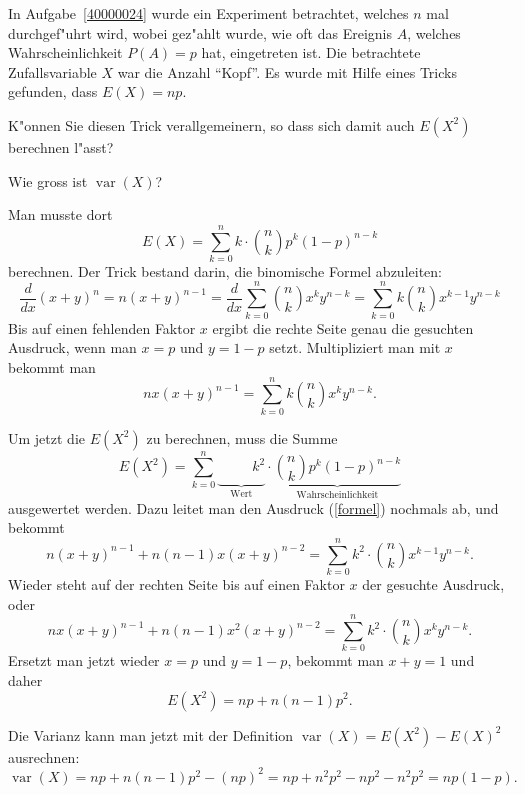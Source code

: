 In Aufgabe~\ref{40000024} wurde ein Experiment betrachtet, welches
$n$ mal durchgef"uhrt wird, wobei gez"ahlt wurde, wie oft das Ereignis
$A$, welches Wahrscheinlichkeit $P(A)=p$ hat, eingetreten ist. Die
betrachtete Zufallsvariable $X$ war die Anzahl ``Kopf''. Es wurde
mit Hilfe eines Tricks gefunden, dass $E(X)=np$.
\begin{teilaufgaben}
\item
K"onnen Sie diesen Trick verallgemeinern, so dass sich damit auch $E(X^2)$
berechnen l"asst?
\item Wie gross ist $\operatorname{var}(X)$?
\end{teilaufgaben}

\begin{loesung}
\begin{teilaufgaben}
\item
Man musste dort
\[
E(X)=\sum_{k=0}^nk\cdot \binom{n}{k}p^k(1-p)^{n-k}
\]
berechnen.
Der Trick bestand darin, die binomische Formel abzuleiten:
\[
\frac{d}{dx}(x+y)^n=n(x+y)^{n-1}
=\frac{d}{dx}\sum_{k=0}^n\binom{n}{k}x^ky^{n-k}
=\sum_{k=0}^nk\binom{n}{k}x^{k-1}y^{n-k}
\]
Bis auf einen fehlenden Faktor $x$ ergibt die rechte Seite genau
die gesuchten Ausdruck, wenn man $x=p$ und $y=1-p$ setzt. Multipliziert
man mit $x$ bekommt man
\begin{equation}
nx(x+y)^{n-1}
=
\sum_{k=0}^nk\binom{n}{k}x^ky^{n-k}.
\label{formel}
\end{equation}

Um jetzt die $E(X^2)$ zu berechnen, muss die Summe
\[
E(X^2)=\sum_{k=0}^n\underbrace{\phantom{\binom{n}{k}}k^2}_{\text{Wert}}\cdot\underbrace{\binom{n}{k}p^k(1-p)^{n-k}}_{\text{Wahrscheinlichkeit}}
\]
ausgewertet werden. Dazu leitet man den Ausdruck (\ref{formel}) nochmals
ab, und bekommt
\[
n(x+y)^{n-1}+n(n-1)x(x+y)^{n-2}
=
\sum_{k=0}^nk^2\cdot \binom{n}{k}x^{k-1}y^{n-k}.
\]
Wieder steht auf der rechten Seite bis auf einen Faktor $x$ der gesuchte
Ausdruck, oder
\[
nx(x+y)^{n-1}+n(n-1)x^2(x+y)^{n-2}
=
\sum_{k=0}^nk^2\cdot \binom{n}{k}x^{k}y^{n-k}.
\]
Ersetzt man jetzt wieder $x=p$ und $y=1-p$, bekommt man $x+y=1$ und daher
\[
E(X^2)=np+n(n-1)p^2.
\]
\item
Die Varianz kann man jetzt mit der Definition $\operatorname{var}(X)=E(X^2)-E(X)^2$ ausrechnen:
\[
\operatorname{var}(X)=np+n(n-1)p^2-(np)^2=np +n^2p^2-np^2-n^2p^2=np(1-p).
\]
\end{teilaufgaben}
\end{loesung}

